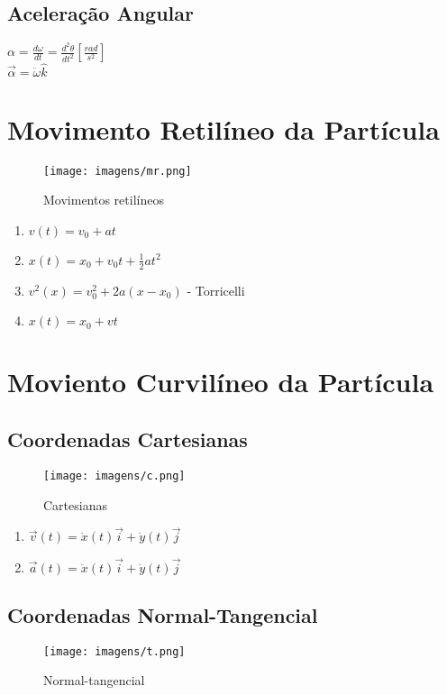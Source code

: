 \documentclass[a4paper, 12pt]{article}
\begin{document}
	\subsection{Aceleração Angular}
		\begin{center}
			\Large			
			$
			\alpha = \frac{d\omega}{dt} = \frac{d^2\theta}{dt^2}[\frac{rad}{s^2}]	
			$\\
			$
			\vec{\alpha} = \ddot{\omega}\hat{k}
			$			
			
		\end{center}

\section{Movimento Retilíneo da Partícula}
	\begin{figure}[h]
		\center
		\texttt{[image: imagens/mr.png]} 
		\caption{Movimentos retilíneos}
	\end{figure}		
	
	\begin{enumerate}
		\item $v(t) = v_0 + at$
		\item $x(t) = x_0 + v_0t + \frac{1}{2}at^2$
		\item $v^2(x) = v_0^2+2a(x-x_0)$ - Torricelli
		\item $x(t) = x_0 + vt$
	\end{enumerate}

\section{Moviento Curvilíneo da Partícula}
	\subsection{Coordenadas Cartesianas}
		\begin{figure}[h]
			\center
			\texttt{[image: imagens/c.png]} 
			\caption{Cartesianas}
		\end{figure}	
		
		\begin{enumerate}
			\item $\vec{v}(t) = \dot{x}(t)\vec{i} + \dot{y}(t)\vec{j}$
			\item $\vec{a}(t) = \ddot{x}(t)\vec{i} + \ddot{y}(t)\vec{j}$
		\end{enumerate}
	\subsection{Coordenadas Normal-Tangencial}
		\begin{figure}[h]
			\center
			\texttt{[image: imagens/t.png]} 
			\caption{Normal-tangencial}
		\end{figure}		
\end{document}
